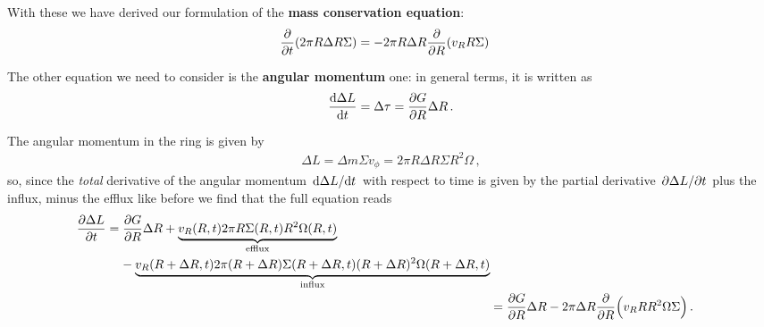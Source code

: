 \documentclass[main.tex]{subfiles}
\begin{document}
With these we have derived our formulation of the \textbf{mass conservation equation}:
%
\begin{align}
\pdv{}{t} \qty(2 \pi R \Delta R \Sigma ) &= - 2 \pi R \Delta R 
\pdv{R}(v_R R \Sigma ) 
\end{align} 


The other equation we need to consider is the \textbf{angular momentum} one: in general terms, it is written as 
%
\begin{align}
\dv{\Delta L}{t} = \Delta \tau = \pdv{ G}{R} \Delta R
\,.
\end{align}

The angular momentum in the ring is given by 
%
\begin{align}
\Delta L = \Delta m \Sigma v_\phi =  2 \pi R \Delta R \Sigma R^2 \Omega 
\,,
\end{align}
%
so, since the \emph{total} derivative of the angular momentum \(\dv*{\Delta L}{t}\) with respect to time is given by the partial derivative \(\pdv*{\Delta L}{t}\) plus the influx, minus the efflux like before we find that the full equation reads
%
\begin{align}
\begin{split}
\pdv{\Delta L}{t}
&= \pdv{G}{R} \Delta R 
+ \underbrace{v_R( R, t) 2 \pi R \Sigma (R, t) R^2\Omega (R, t)}_{\text{efflux}} \\
&\phantom{=}\ - \underbrace{v_R(R + \Delta R, t) 2 \pi (R + \Delta R) \Sigma (R + \Delta R, t)( R + \Delta R)^2 \Omega (R + \Delta R, t)}_{\text{influx}}
\end{split}  \\
&= \pdv{G}{R} \Delta R - 2 \pi \Delta R \pdv{}{R} \qty(v_R R R^2 \Omega \Sigma )
\,.
\end{align}
\end{document}

